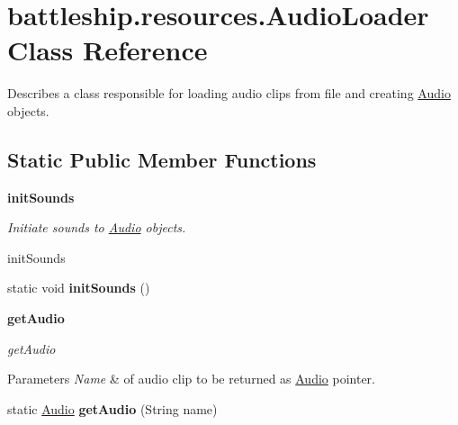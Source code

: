 \hypertarget{classbattleship_1_1resources_1_1AudioLoader}{}\section{battleship.\+resources.\+Audio\+Loader Class Reference}
\label{classbattleship_1_1resources_1_1AudioLoader}


Describes a class responsible for loading audio clips from file and creating \hyperlink{classbattleship_1_1resources_1_1Audio}{Audio} objects.  


\subsection*{Static Public Member Functions}
\begin{Indent}{\bf init\+Sounds}\par
{\em Initiate sounds to \hyperlink{classbattleship_1_1resources_1_1Audio}{Audio} objects.

init\+Sounds }\begin{DoxyCompactItemize}
\item 
\hypertarget{classbattleship_1_1resources_1_1AudioLoader_ad3f838aa63a295fd318970d4afa629a7}{}static void {\bfseries init\+Sounds} ()\label{classbattleship_1_1resources_1_1AudioLoader_ad3f838aa63a295fd318970d4afa629a7}

\end{DoxyCompactItemize}
\end{Indent}
\begin{Indent}{\bf get\+Audio}\par
{\em get\+Audio


\begin{DoxyParams}{Parameters}
{\em Name} & of audio clip to be returned as \hyperlink{classbattleship_1_1resources_1_1Audio}{Audio} pointer. \\
\hline
\end{DoxyParams}
}\begin{DoxyCompactItemize}
\item 
\hypertarget{classbattleship_1_1resources_1_1AudioLoader_af6647e270a8e8fb2edeae3bce9d12357}{}static \hyperlink{classbattleship_1_1resources_1_1Audio}{Audio} {\bfseries get\+Audio} (String name)\label{classbattleship_1_1resources_1_1AudioLoader_af6647e270a8e8fb2edeae3bce9d12357}

\end{DoxyCompactItemize}
\end{Indent}



